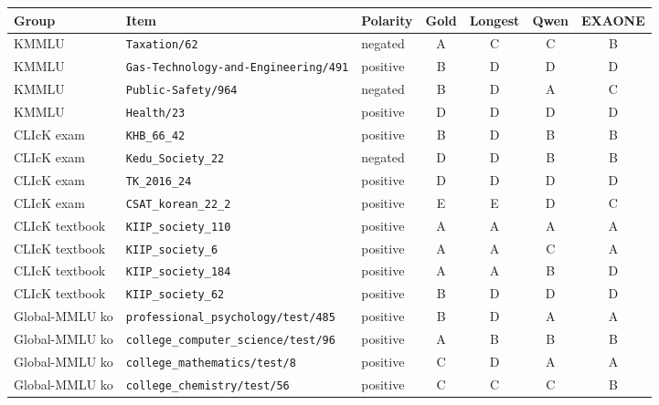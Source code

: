 \begin{tabular}{@{}lllcccc@{}}
\toprule
Group & Item & Polarity & Gold & Longest & Qwen & EXAONE \\
\midrule
KMMLU & \texttt{Taxation/62} & negated & A & C & C & B \\
KMMLU & \texttt{Gas-Technology-and-Engineering/491} & positive & B & D & D & D \\
KMMLU & \texttt{Public-Safety/964} & negated & B & D & A & C \\
KMMLU & \texttt{Health/23} & positive & D & D & D & D \\
CLIcK exam & \texttt{KHB\_66\_42} & positive & B & D & B & B \\
CLIcK exam & \texttt{Kedu\_Society\_22} & negated & D & D & B & B \\
CLIcK exam & \texttt{TK\_2016\_24} & positive & D & D & D & D \\
CLIcK exam & \texttt{CSAT\_korean\_22\_2} & positive & E & E & D & C \\
CLIcK textbook & \texttt{KIIP\_society\_110} & positive & A & A & A & A \\
CLIcK textbook & \texttt{KIIP\_society\_6} & positive & A & A & C & A \\
CLIcK textbook & \texttt{KIIP\_society\_184} & positive & A & A & B & D \\
CLIcK textbook & \texttt{KIIP\_society\_62} & positive & B & D & D & D \\
Global-MMLU ko & \texttt{professional\_psychology/test/485} & positive & B & D & A & A \\
Global-MMLU ko & \texttt{college\_computer\_science/test/96} & positive & A & B & B & B \\
Global-MMLU ko & \texttt{college\_mathematics/test/8} & positive & C & D & A & A \\
Global-MMLU ko & \texttt{college\_chemistry/test/56} & positive & C & C & C & B \\
\bottomrule
\end{tabular}

